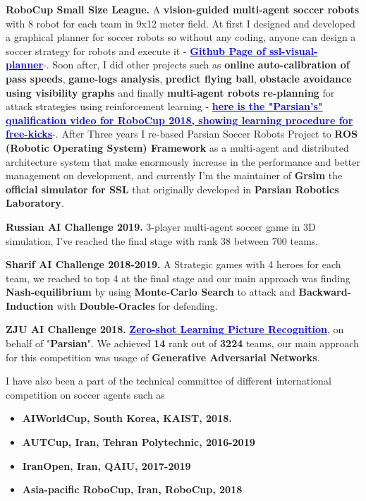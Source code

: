 \documentclass[11pt, a4paper]{awesome-cv}
\begin{document}
\begin{cvletter}
\textbf{RoboCup Small Size League.} A \textbf{vision-guided multi-agent soccer robots} with 8 robot for each team in 9x12 meter field. At first I designed and developed a graphical planner for soccer robots so without any coding, anyone can design a soccer strategy for robots and execute it - 
\href{http://github.com/ParsianRoboticLab/ssl-visual-planner}{\textcolor{blue}{\textbf{Github Page of ssl-visual-planner}}}-. Soon after, I did other projects such as \textbf{online auto-calibration of pass speeds}, \textbf{game-logs analysis}, \textbf{predict flying ball}, \textbf{obstacle avoidance using visibility graphs} and finally \textbf{multi-agent robots re-planning} for attack strategies using reinforcement learning - 
\href{https://www.youtube.com/watch?v=SfxZtV8uzFQ}{\textcolor{blue}{\textbf{here is the "Parsian's" qualification video for RoboCup 2018, showing learning procedure for free-kicks}}}-.
After Three years I re-based Parsian Soccer Robots Project to \textbf{ROS (Robotic Operating System) Framework} as a multi-agent and distributed architecture system that make enormously increase in the performance and better management on development, and currently I'm the maintainer of \textbf{Grsim} the \textbf{official simulator for SSL} that originally developed in \textbf{Parsian Robotics Laboratory}.

\textbf{Russian AI Challenge 2019.} 3-player multi-agent soccer game in 3D simulation, I've reached the final stage with rank 38 between 700 teams.

\textbf{Sharif AI Challenge 2018-2019.} A Strategic games with 4 heroes for each team, we reached to top 4 at the final stage and our main approach was finding \textbf{Nash-equilibrium} by using \textbf{Monte-Carlo Search} to attack and \textbf{Backward-Induction} with \textbf{Double-Oracles} for defending. 

\textbf{ZJU AI Challenge 2018.} \href{https://tianchi.aliyun.com/competition/rankingList.htm?spm=5176.100067.5678.4.3c934bddlu2Aga&raceId=231677}{\textcolor{blue}{\textbf{Zero-shot Learning Picture Recognition}}}, on behalf of "\textbf{Parsian}". We achieved \textbf{14} rank out of \textbf{3224} teams, our main approach for this competition was usage of \textbf{Generative Adversarial Networks}.

I have also been a part of the technical committee of different international competition on soccer agents such as 
\newline
\begin{itemize}
    \item \textbf{AIWorldCup, South Korea, KAIST, 2018.}
    \item \textbf{AUTCup, Iran, Tehran Polytechnic, 2016-2019}
    \item \textbf{IranOpen, Iran, QAIU, 2017-2019}
    \item \textbf{Asia-pacific RoboCup, Iran, RoboCup, 2018}
\end{itemize}



\end{cvletter}
\end{document}

